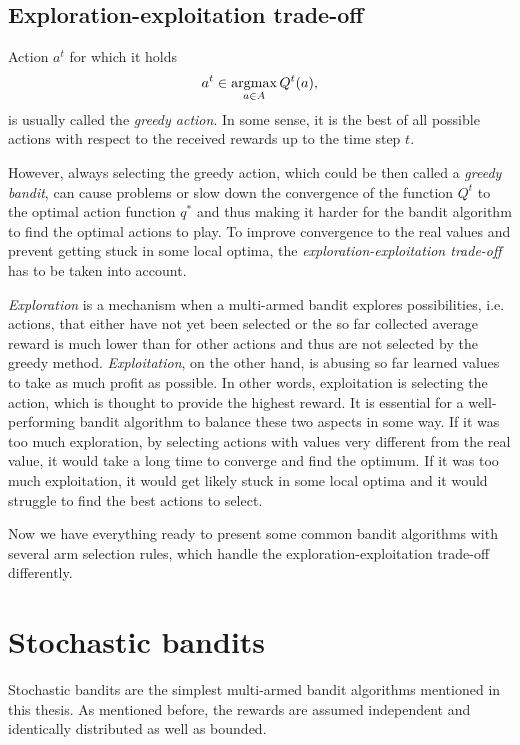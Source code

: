\documentclass[../main.tex]{subfiles}
\begin{document}
\subsection{Exploration-exploitation trade-off}\label{bandit:learn:expexp}
Action $a^t$ for which it holds
\begin{equation}\label{bandit:learn:expexp:greedyaction}
    a^{t} \in \operatorname*{argmax}_{a \in A} Q^t(a),
\end{equation}
is usually called the \textit{greedy action}.
In some sense, it is the best of all possible actions with respect to the received rewards up to the time step $t$.

However, always selecting the greedy action, which could be then called a \textit{greedy bandit}, can cause problems or slow down the convergence of the function $Q^t$ to the optimal action function $q^*$ and thus making it harder for the bandit algorithm to find the optimal actions to play.
To improve convergence to the real values and prevent getting stuck in some local optima, the \textit{exploration-exploitation trade-off} has to be taken into account.

\textit{Exploration} is a mechanism when a multi-armed bandit explores possibilities, i.e. actions, that either have not yet been selected or the so far collected average reward is much lower than for other actions and thus are not selected by the greedy method.
\textit{Exploitation}, on the other hand, is abusing so far learned values to take as much profit as possible.
In other words, exploitation is selecting the action, which is thought to provide the highest reward.
It is essential for a well-performing bandit algorithm to balance these two aspects in some way.
If it was too much exploration, by selecting actions with values very different from the real value, it would take a long time to converge and find the optimum.
If it was too much exploitation, it would get likely stuck in some local optima and it would struggle to find the best actions to select.

Now we have everything ready to present some common bandit algorithms with several arm selection rules, which handle the exploration-exploitation trade-off differently.

\section{Stochastic bandits}\label{bandit:stochastic}
Stochastic bandits are the simplest multi-armed bandit algorithms mentioned in this thesis.
As mentioned before, the rewards are assumed independent and identically distributed as well as bounded.
\end{document}
